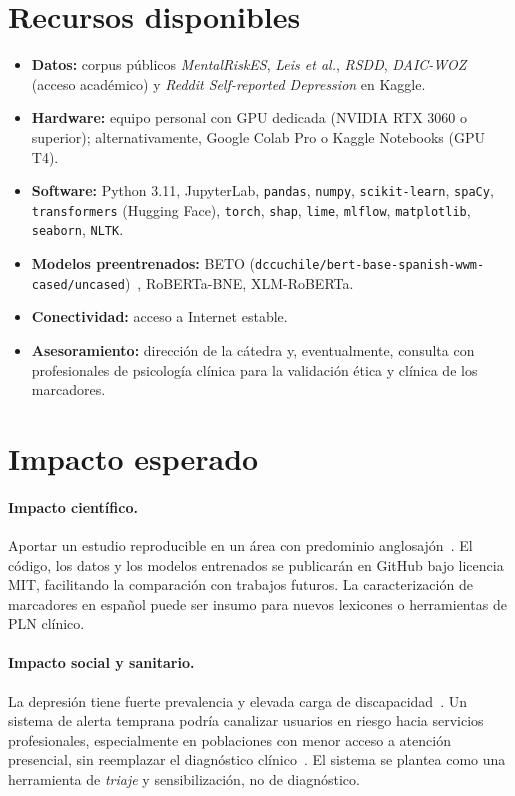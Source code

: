 \documentclass[12pt,a4paper,spanish]{article}
\begin{document}
\section{Recursos disponibles}

\begin{itemize}[leftmargin=2em]
    \item \textbf{Datos:} corpus públicos \emph{MentalRiskES}, \emph{Leis et al.}, \emph{RSDD}, \emph{DAIC-WOZ} (acceso académico) y \emph{Reddit Self-reported Depression} en Kaggle.
    \item \textbf{Hardware:} equipo personal con GPU dedicada (NVIDIA RTX 3060 o superior); alternativamente, Google Colab Pro o Kaggle Notebooks (GPU T4).
    \item \textbf{Software:} Python 3.11, JupyterLab, \texttt{pandas}, \texttt{numpy}, \texttt{scikit-learn}, \texttt{spaCy}, \texttt{transformers} (Hugging Face), \texttt{torch}, \texttt{shap}, \texttt{lime}, \texttt{mlflow}, \texttt{matplotlib}, \texttt{seaborn}, \texttt{NLTK}.
    \item \textbf{Modelos preentrenados:} BETO (\texttt{dccuchile/bert-base-spanish-wwm-cased/uncased})~\cite{betohf}, RoBERTa-BNE, XLM-RoBERTa.
    \item \textbf{Conectividad:} acceso a Internet estable.
    \item \textbf{Asesoramiento:} dirección de la cátedra y, eventualmente, consulta con profesionales de psicología clínica para la validación ética y clínica de los marcadores.
\end{itemize}

\section{Impacto esperado}

\paragraph{Impacto científico.} Aportar un estudio reproducible en un área con predominio anglosajón~\cite{reviberopsicologia2024}. El código, los datos y los modelos entrenados se publicarán en GitHub bajo licencia MIT, facilitando la comparación con trabajos futuros. La caracterización de marcadores en español puede ser insumo para nuevos lexicones o herramientas de PLN clínico.

\paragraph{Impacto social y sanitario.} La depresión tiene fuerte prevalencia y elevada carga de discapacidad~\cite{who2025depression}. Un sistema de alerta temprana podría canalizar usuarios en riesgo hacia servicios profesionales, especialmente en poblaciones con menor acceso a atención presencial, sin reemplazar el diagnóstico clínico~\cite{jmir2019spanish,leis2019tesis}. El sistema se plantea como una herramienta de \emph{triaje} y sensibilización, no de diagnóstico.
\end{document}
